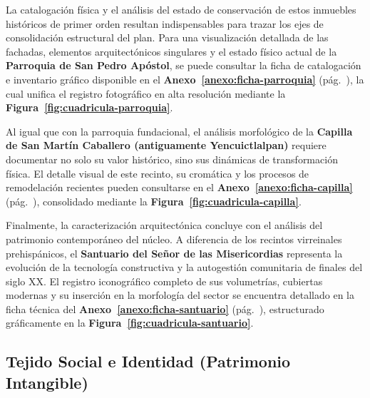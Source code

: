 La catalogación física y el análisis del estado de conservación de estos inmuebles históricos de primer orden 
resultan indispensables para trazar los ejes de consolidación estructural del plan. Para una visualización 
detallada de las fachadas, elementos arquitectónicos singulares y el estado físico actual de la 
\textbf{Parroquia de San Pedro Apóstol}, se puede consultar la ficha de catalogación e inventario gráfico 
disponible en el \textbf{Anexo~\ref{anexo:ficha-parroquia}} (pág.~\pageref{anexo:ficha-parroquia}), 
la cual unifica el registro fotográfico en alta resolución mediante la \textbf{Figura~\ref{fig:cuadricula-parroquia}}.

Al igual que con la parroquia fundacional, el análisis morfológico de la 
\textbf{Capilla de San Martín Caballero (antiguamente Yencuictlalpan)} requiere documentar no solo 
su valor histórico, sino sus dinámicas de transformación física. 
El detalle visual de este recinto, su cromática y los procesos de remodelación recientes pueden 
consultarse en el \textbf{Anexo~\ref{anexo:ficha-capilla}} (pág.~\pageref{anexo:ficha-capilla}), 
consolidado mediante la \textbf{Figura~\ref{fig:cuadricula-capilla}}.

Finalmente, la caracterización arquitectónica concluye con el análisis del patrimonio contemporáneo del núcleo. 
A diferencia de los recintos virreinales prehispánicos, el \textbf{Santuario del Señor de las Misericordias} 
representa la evolución de la tecnología constructiva y la autogestión comunitaria de finales del siglo XX. 
El registro iconográfico completo de sus volumetrías, cubiertas modernas y su inserción en la morfología del 
sector se encuentra detallado en la ficha técnica del \textbf{Anexo~\ref{anexo:ficha-santuario}} 
(pág.~\pageref{anexo:ficha-santuario}), estructurado gráficamente en la \textbf{Figura~\ref{fig:cuadricula-santuario}}.


\subsection{Tejido Social e Identidad (Patrimonio Intangible)}
\label{ssec:tejido-social}

